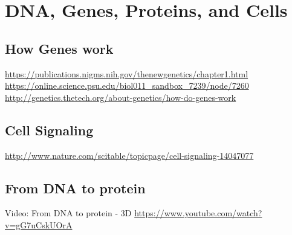 \documentclass[11pt, a4paper, oneside]{article}   	%
\begin{document}
\section{DNA, Genes, Proteins, and Cells}

\subsection{How Genes work}
\url{https://publications.nigms.nih.gov/thenewgenetics/chapter1.html}
\url{https://online.science.psu.edu/biol011_sandbox_7239/node/7260}
\url{http://genetics.thetech.org/about-genetics/how-do-genes-work}

\subsection{Cell Signaling}
\url{http://www.nature.com/scitable/topicpage/cell-signaling-14047077}

\subsection{From DNA to protein}

Video: From DNA to protein - 3D
\url{https://www.youtube.com/watch?v=gG7uCskUOrA}
\end{document}
